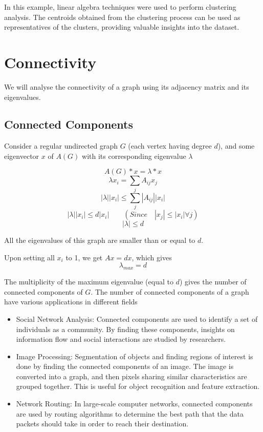 \documentclass[12pt, a4paper]{article}
\begin{document}
\begin{flushleft}
\begin{flushleft}
\begin{flushleft}
\begin{enumerate}
            \end{enumerate}
                In this example, linear algebra techniques were used to perform clustering analysis. The centroids obtained from the clustering process can be used as representatives of the clusters, providing valuable insights into the dataset.
            
        \end{flushleft}
        \end{flushleft}
    \end{flushleft}
  
    \section{Connectivity}
    We will analyse the connectivity of a graph using its adjacency matrix and its eigenvalues.

    \subsection{Connected Components \cite{baeldung}}
    \begin{flushleft}
    Consider a regular undirected graph $G$ (each vertex having degree $d$), and some eigenvector $x$ of $A(G)$ with its corresponding eigenvalue $\lambda$

    $$A(G)*x = \lambda*x$$
    $$\lambda x_i = \sum_{j} A_{ij}x_j$$
    $$|\lambda||x_i| \le \sum_{j} |A_{ij}||x_i|$$
    $$ |\lambda||x_i| \le d|x_i| \qquad (Since \quad |x_j| \le |x_i| \forall j)$$
    $$|\lambda| \le d$$

    All the eigenvalues of this graph are smaller than or equal to $d$. \cite{bhaskara4}

    Upon setting all $x_i$ to 1, we get $Ax = dx$, which gives
    $$\lambda_{max} = d$$

      The multiplicity of the maximum eigenvalue (equal to $d$) gives the number of connected components of $G$. \cite{bhaskara5} The number of connected components of a graph have various applications in different fields

      \begin{itemize}
        \item Social Network Analysis: Connected components are used to identify a set of individuals as a community. By finding these components, insights on information flow and social interactions are studied by researchers.
        \item Image Processing: Segmentation of objects and finding regions of interest is done by finding the connected components of an image. The image is converted into a graph, and then pixels sharing similar characteristics are grouped together. This is useful for object recognition and feature extraction.

        \item Network Routing: In large-scale computer networks, connected components are used by routing algorithms to determine the best path that the data packets should take in order to reach their destination.
      \end{itemize}
    \end{flushleft}
\end{document}
